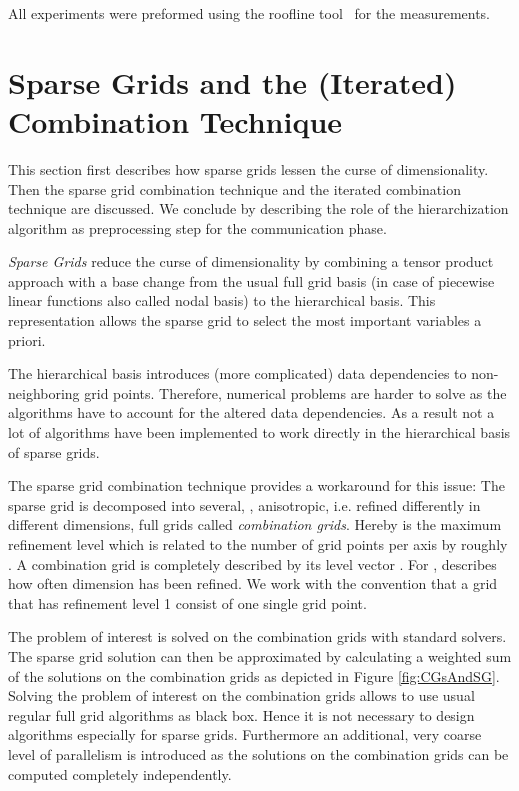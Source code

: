 \documentclass[letterpaper]{article}
\newcommand{\mypar}[1]{{\bf #1.}}
\begin{document}
			All experiments were preformed using the roofline tool~\cite{ofenbeck13applyingRoofline} for the measurements.

		\section{Sparse Grids and the (Iterated) Combination Technique}

		This section first describes how sparse grids lessen the curse of dimensionality. Then the sparse grid combination technique and the iterated combination technique are discussed. We conclude by describing the role of the hierarchization algorithm as preprocessing step for the communication phase.



		\noindent	\mypar{Sparse Grids}
			\emph{Sparse Grids} reduce the curse of dimensionality by combining a tensor product approach with a base change from the usual full grid basis (in case of piecewise linear functions also called nodal basis)  to the hierarchical basis. This representation allows the sparse grid to select the most important variables a priori.

			The hierarchical basis introduces (more complicated) data dependencies to non-neighboring grid points. Therefore, numerical problems are harder to solve as the algorithms have to account for the altered data dependencies. As a result not a lot of algorithms have been implemented to work directly in the hierarchical basis of sparse grids.


		\noindent \mypar{The Combination Technique}
			The sparse grid combination technique \cite{griebel92CombiTechnique} provides a workaround for this issue: The sparse grid is decomposed into several, , an\-isotropic, i.e. refined differently in different dimensions, full grids called \emph{combination grids}. Hereby  is the maximum refinement level which is related to the number of grid points per axis by roughly . A combination grid is completely described by its level vector . For ,  describes how often dimension  has been refined. We work with the convention that a grid that has refinement level 1 consist of one single grid point.

			The problem of interest is solved on the combination grids with standard solvers.
			The sparse grid solution can then be approximated by calculating a weighted sum of the solutions on the combination grids as depicted in Figure \ref{fig:CGsAndSG}.
			Solving the problem of interest on the combination grids allows to use usual regular full grid algorithms as black box.  Hence it is not necessary to design algorithms especially for sparse grids. Furthermore an additional, very coarse level of parallelism is introduced as the solutions on the combination grids can be computed completely independently.
\end{document}
